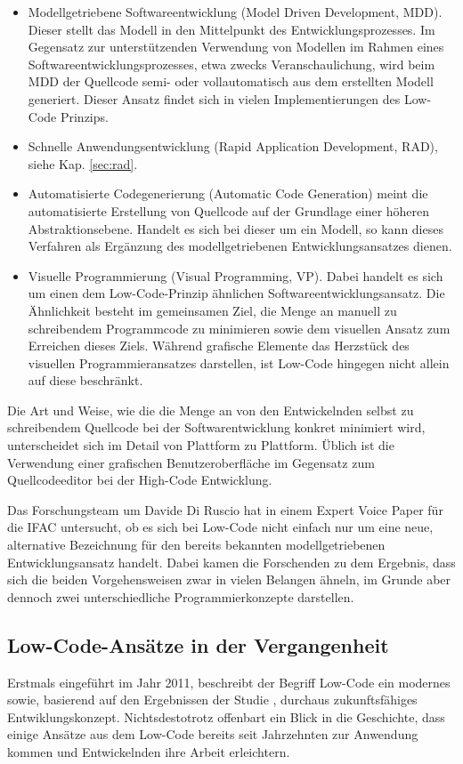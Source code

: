 \documentclass[acmtog, language=ngerman]{acmart}
\begin{document}
\begin{itemize}
    \item Modellgetriebene Softwareentwicklung (Model Driven Development, MDD). Dieser stellt das Modell in den Mittelpunkt des Entwicklungsprozesses. Im Gegensatz zur unterstützenden Verwendung von Modellen im Rahmen eines Softwareentwicklungsprozesses, etwa zwecks Veranschaulichung, wird beim MDD der Quellcode semi- oder vollautomatisch aus dem erstellten Modell generiert. Dieser Ansatz findet sich in vielen Implementierungen des Low-Code Prinzips.
    \item Schnelle Anwendungsentwicklung (Rapid Application Development, RAD), siehe Kap. \ref{sec:rad}.
    \item Automatisierte Codegenerierung (Automatic Code Generation) meint die automatisierte Erstellung von Quellcode auf der Grundlage einer höheren Abstraktionsebene. Handelt es sich bei dieser um ein Modell, so kann dieses Verfahren als Ergänzung des modellgetriebenen Entwicklungsansatzes dienen.
    \item Visuelle Programmierung (Visual Programming, VP). Dabei handelt es sich um einen dem Low-Code-Prinzip ähnlichen Softwareentwicklungsansatz. Die Ähnlichkeit besteht im gemeinsamen Ziel, die Menge an manuell zu schreibendem Programmcode zu minimieren sowie dem visuellen Ansatz zum Erreichen dieses Ziels. Während grafische Elemente das Herzstück des visuellen Programmieransatzes darstellen, ist Low-Code hingegen nicht allein auf diese beschränkt.
\end{itemize}

Die Art und Weise, wie die die Menge an von den Entwickelnden selbst zu schreibendem Quellcode bei der Softwarentwicklung konkret minimiert wird, unterscheidet sich im Detail von Plattform zu Plattform. Üblich ist die Verwendung einer grafischen Benutzeroberfläche im Gegensatz zum Quellcodeeditor bei der High-Code Entwicklung.

Das Forschungsteam um Davide Di Ruscio hat in einem Expert Voice Paper für die IFAC untersucht, ob es sich bei Low-Code nicht einfach nur um eine neue, alternative Bezeichnung für den bereits bekannten modellgetriebenen Entwicklungsansatz handelt. Dabei kamen die Forschenden zu dem Ergebnis, dass sich die beiden Vorgehensweisen zwar in vielen Belangen ähneln, im Grunde aber dennoch zwei unterschiedliche Programmierkonzepte darstellen. \cite{low_code_vs_mdd}

\subsection{Low-Code-Ansätze in der Vergangenheit}
Erstmals eingeführt im Jahr 2011, beschreibt der Begriff Low-Code ein modernes sowie, basierend auf den Ergebnissen der Studie \cite{studie_low_code}, durchaus zukunftsfähiges Entwiklungskonzept. Nichtsdestotrotz offenbart ein Blick in die Geschichte, dass einige Ansätze aus dem Low-Code bereits seit Jahrzehnten zur Anwendung kommen und Entwickelnden ihre Arbeit erleichtern.
\end{document}
